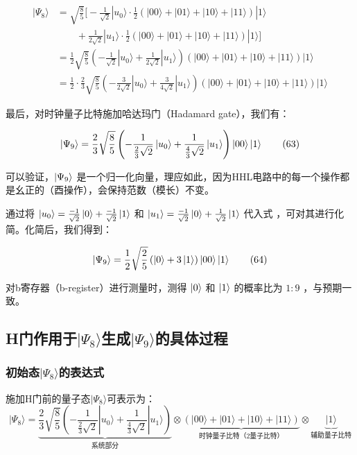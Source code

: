 \documentclass{article}
\begin{document}
\[
\begin{aligned}
|\Psi_8\rangle &= \sqrt{\frac{8}{5}} \Bigg[ -\frac{1}{\sqrt{2}} |u_0\rangle \cdot \frac{1}{2} \left( |00\rangle + |01\rangle + |10\rangle + |11\rangle \right)|1\rangle \\
&\qquad + \frac{1}{2\sqrt{2}} |u_1\rangle \cdot \frac{1}{2} \left( |00\rangle + |01\rangle + |10\rangle + |11\rangle \right)|1\rangle \Bigg] \\
&= \frac{1}{2}\sqrt{\frac{8}{5}} \left( -\frac{1}{\sqrt{2}} |u_0\rangle + \frac{1}{2\sqrt{2}} |u_1\rangle \right) \left( |00\rangle + |01\rangle + |10\rangle + |11\rangle \right)|1\rangle \\
&= \frac{1}{2} \cdot \frac{2}{3} \sqrt{\frac{8}{5}} \left( -\frac{3}{2\sqrt{2}} |u_0\rangle + \frac{3}{4\sqrt{2}} |u_1\rangle \right) \left( |00\rangle + |01\rangle + |10\rangle + |11\rangle \right)|1\rangle
\end{aligned}
\]

最后，对时钟量子比特施加哈达玛门（Hadamard gate），我们有：

\begin{equation}
\ket{\Psi_9} = \frac{2}{3}\sqrt{\frac{8}{5}} \left( -\frac{1}{\frac{2}{3}\sqrt{2}} \ket{u_0} + \frac{1}{\frac{4}{3}\sqrt{2}} \ket{u_1} \right) \ket{00} \ket{1} \tag{63}
\end{equation}

可以验证，$\ket{\Psi_9}$ 是一个归一化向量，理应如此，因为HHL电路中的每一个操作都是幺正的（酉操作），会保持范数（模长）不变。

通过将 $\ket{u_0} = \frac{-1}{\sqrt{2}}\ket{0} + \frac{-1}{\sqrt{2}}\ket{1}$ 和 $\ket{u_1} = \frac{-1}{\sqrt{2}}\ket{0} + \frac{1}{\sqrt{2}}\ket{1}$ 代入式 ，可对其进行化简。化简后，我们得到：

\begin{equation}
\ket{\Psi_9} = \frac{1}{2}\sqrt{\frac{2}{5}} \left( \ket{0} + 3\ket{1} \right) \ket{00} \ket{1} \tag{64}
\end{equation}

对b寄存器（b-register）进行测量时，测得 $\ket{0}$ 和 $\ket{1}$ 的概率比为 $1:9$ ，与预期一致。
\subsection{H门作用于$|\Psi_8\rangle$生成$|\Psi_9\rangle$的具体过程}
\subsubsection{初始态$|\Psi_8\rangle$的表达式}
施加H门前的量子态$|\Psi_8\rangle$可表示为：
\[
|\Psi_8\rangle = 
\underbrace{\frac{2}{3}\sqrt{\frac{8}{5}} \left( -\frac{1}{\frac{2}{3}\sqrt{2}} |u_0\rangle + \frac{1}{\frac{4}{3}\sqrt{2}} |u_1\rangle \right)}_{\text{系统部分}} 
\otimes 
\underbrace{\left( |00\rangle + |01\rangle + |10\rangle + |11\rangle \right)}_{\text{时钟量子比特（2量子比特）}} 
\otimes 
\underbrace{|1\rangle}_{\text{辅助量子比特}}
\]
\end{document}
